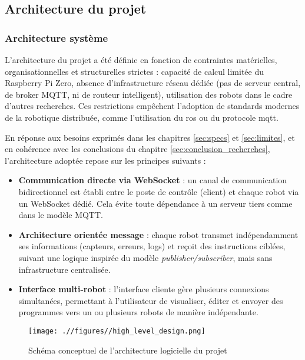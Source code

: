 \subsection{Architecture du projet} \label{sec:architecture}

\subsubsection{Architecture système} \label{sec:architecture_système}
L'architecture du projet a été définie en fonction de contraintes matérielles, organisationnelles et structurelles strictes : capacité de calcul limitée du Raspberry Pi Zero, absence d'infrastructure réseau dédiée (pas de serveur central, de broker MQTT, ni de routeur intelligent), utilisation des robots dans le cadre d'autres recherches.  
Ces restrictions empêchent l’adoption de standards modernes de la robotique distribuée, comme l’utilisation du \acrfull{ros} ou du protocole \acrfull{mqtt}.

En réponse aux besoins exprimés dans les chapitres \ref{sec:specs} et \ref{sec:limites}, et en cohérence avec les conclusions du chapitre \ref{sec:conclusion_recherches}, l’architecture adoptée repose sur les principes suivants :

\begin{itemize}
    \item \textbf{Communication directe via WebSocket} : un canal de communication bidirectionnel est établi entre le poste de contrôle (client) et chaque robot via un WebSocket dédié. 
    Cela évite toute dépendance à un serveur tiers comme dans le modèle MQTT.
    
    \item \textbf{Architecture orientée message} : chaque robot transmet indépendamment ses informations (capteurs, erreurs, logs) et reçoit des instructions ciblées, suivant une logique inspirée du modèle \textit{publisher/subscriber}, mais sans infrastructure centralisée.
    
    \item \textbf{Interface multi-robot} : l’interface cliente gère plusieurs connexions simultanées, permettant à l’utilisateur de visualiser, éditer et envoyer des programmes vers un ou plusieurs robots de manière indépendante.
\end{itemize}

\begin{figure}[h!]
    \centering
    \texttt{[image: .//figures//high\_level\_design.png]}
    \caption{\label{fig:conceptual_hld} Schéma conceptuel de l'architecture logicielle du projet}
\end{figure}

